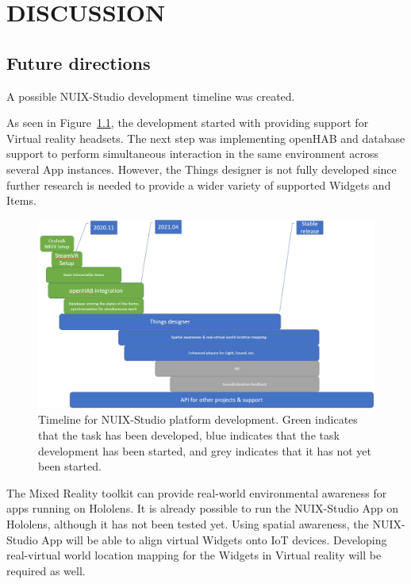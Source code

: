 
\chapter{DISCUSSION}

\section{Future directions}

A possible NUIX-Studio development timeline was created.

As seen in Figure~\ref{fig:Timeline-figure}, the development started with providing support for Virtual reality headsets. The next step was implementing openHAB and database support to perform simultaneous interaction in the same environment across several App instances. However, the Things designer is not fully developed since further research is needed to provide a wider variety of supported Widgets and Items.

\begin{figure}
  \centering
  \includegraphics[width=0.9\linewidth]{figures/Timeline.png}
  \caption{Timeline for NUIX-Studio platform development. Green indicates that the task has been developed, blue indicates that the task development has been started, and grey indicates that it has not yet been started.}
  \label{fig:Timeline-figure}
\end{figure}

The Mixed Reality toolkit can provide real-world environmental awareness for apps running on Hololens. It is already possible to run the NUIX-Studio App on Hololens, although it has not been tested yet. Using spatial awareness, the NUIX-Studio App will be able to align virtual Widgets onto IoT devices. Developing real-virtual world location mapping for the Widgets in Virtual reality will be required as well.

